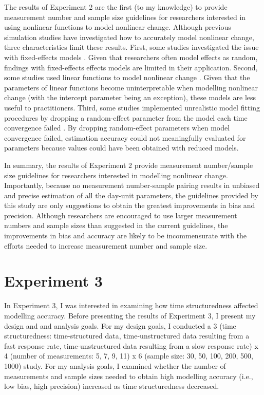 \documentclass[
12pt, %
twoside,
english]{guelphthesis}
\begin{document}
The results of Experiment 2 are the first (to my knowledge) to provide measurement number and sample size guidelines for researchers interested in using nonlinear functions to model nonlinear change. Although previous simulation studies have investigated how to accurately model nonlinear change, three characteristics limit these results. First, some studies investigated the issue with fixed-effects models \autocite[e.g.,][]{finch2017}. Given that researchers often model effects as random, findings with fixed-effects effects models are limited in their application. Second, some studies used linear functions to model nonlinear change \autocites[e.g.,][]{fine2019,liu2022}. Given that the parameters of linear functions become uninterpretable when modelling nonlinear change (with the intercept parameter being an exception), these models are less useful to practitioners. Third, some studies implemented unrealistic model fitting procedures by dropping a random-effect parameter from the model each time convergence failed \autocite{finch2017}. By dropping random-effect parameters when model convergence failed, estimation accuracy could not meaningfully evaluated for parameters because values could have been obtained with reduced models.

In summary, the results of Experiment 2 provide measurement number/sample size guidelines for researchers interested in modelling nonlinear change. Importantly, because no measurement number-sample pairing results in unbiased and precise estimation of all the day-unit parameters, the guidelines provided by this study are only suggestions to obtain the greatest improvements in bias and precision. Although researchers are encouraged to use larger measurement numbers and sample sizes than suggested in the current guidelines, the improvements in bias and accuracy are likely to be incommensurate with the efforts needed to increase measurement number and sample size.

\hypertarget{Exp3}{%
\chapter{Experiment 3}\label{Exp3}}

In Experiment 3, I was interested in examining how time structuredness affected modelling accuracy. Before presenting the results of Experiment 3, I present my design and and analysis goals. For my design goals, I conducted a 3 (time structuredness: time-structured data, time-unstructured data resulting from a fast response rate, time-unstructured data resulting from a slow response rate) x 4 (number of measurements: 5, 7, 9, 11) x 6 (sample size: 30, 50, 100, 200, 500, 1000) study. For my analysis goals, I examined whether the number of measurements and sample sizes needed to obtain high modelling accuracy (i.e., low bias, high precision) increased as time structuredness decreased.
\end{document}
